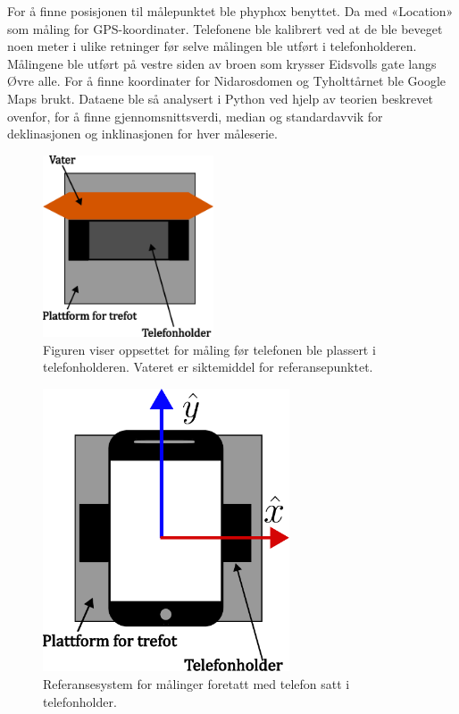 For å finne posisjonen til målepunktet ble phyphox benyttet. Da med «Location» som måling for GPS-koordinater. Telefonene ble kalibrert ved at de ble beveget noen meter i ulike retninger før selve målingen ble utført i telefonholderen. Målingene ble utført på vestre siden av broen som krysser Eidsvolls gate langs Øvre alle. 
For å finne koordinater for Nidarosdomen og Tyholttårnet ble Google Maps brukt.
Dataene ble så analysert i Python ved hjelp av teorien beskrevet ovenfor, for å finne gjennomsnittsverdi, median og standardavvik for deklinasjonen og inklinasjonen for hver måleserie.     

 
\begin{figure}
    \centering
    \includegraphics[width=0.45\textwidth]{img/Plattform med vater.pdf}                 
    \caption{Figuren viser oppsettet for måling før telefonen ble plassert i telefonholderen. Vateret er siktemiddel for referansepunktet.}
    \label{fig:med_vater}
\end{figure}



\begin{figure}
    \centering
    \includegraphics[width=0.65\textwidth]{img/Plattform med telefoni.pdf}
    \caption{Referansesystem for målinger foretatt med telefon satt i telefonholder.}
    \label{fig:telf_akser}
\end{figure}